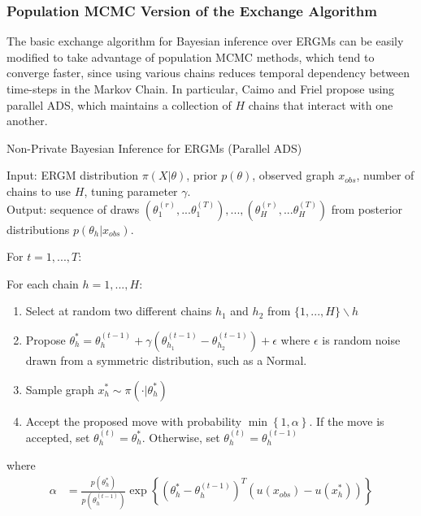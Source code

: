 \subsubsection{Population MCMC Version of the Exchange Algorithm}

The basic exchange algorithm for Bayesian inference over ERGMs can be easily modified to take advantage of population MCMC methods, which tend to converge faster, since using various chains reduces temporal dependency between time-steps in the Markov Chain. In particular, Caimo and Friel propose using parallel ADS, which maintains a collection of $H$ chains that interact with one another.

\begin{algorithm}[!ht]
	\caption{Non-Private Bayesian Inference for ERGMs (Parallel ADS) \cite{CF11} }
	Input: ERGM distribution $\pi(X | \theta)$, prior $p(\theta)$, observed graph $x_{obs}$, number of chains to use $H$, tuning parameter $\gamma$.\\
	Output: sequence of draws $(\theta_1^{(r)},...\theta_1^{(T)}),...,(\theta_H^{(r)},...\theta_H^{(T)})$ from posterior distributions $p(\theta_h | x_{obs})$.
	
	\vspace{0.1in}
	For {$ t = 1,...,T$}:
	
	\vspace{0.1in}
	
	\hspace{0.1in} For each chain {$ h = 1,...,H$}:
	
	\begin{enumerate}
		\item Select at random  two different chains $h_1$ and $h_2$ from $\{1,...,H\} \backslash h$
		\item  Propose $\theta^*_h = \theta^{(t-1)}_h + \gamma\left(\theta^{(t-1)}_{h_1} -  \theta^{(t-1)}_{h_2}\right) + \epsilon$ 
		\newline where $\epsilon$ is random noise drawn from a symmetric distribution, such as a Normal.
		\item Sample graph $x_h^* \sim \pi(\cdot | \theta_h^*)$
		\item Accept the proposed move with probability $\min\left\{1, \alpha\right\}$. If the move is accepted, set $\theta_h^{(t)} = \theta_h^*$. Otherwise, set $\theta_h^{(t)} = \theta_h^{(t-1)}$
	\end{enumerate}
	where \begin{align*}
	\alpha &= \frac{p(\theta_h^*)}{p(\theta_h^{(t-1)})} \exp\left\{\left(\theta_h^* - \theta_h^{(t-1)}\right)^T\left(u(x_{obs}) - u(x_h^*)\right) \right\}
	\end{align*}
\end{algorithm}

